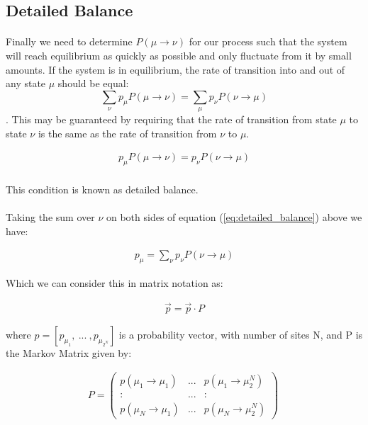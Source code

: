 \documentclass[12pt] {report} %
\begin{document}
			\subsection{Detailed Balance}	\label{sec:detailed_balance}
			
			\paragraph{}
				Finally we need to determine $P{(\mu \rightarrow \nu)}$ for our process such that the system will reach equilibrium as quickly as possible and only fluctuate from it by small amounts. If the system is in equilibrium, the rate of transition into and out of any state $\mu$ should be equal: $$\sum_{\nu}p_\mu P(\mu \rightarrow \nu) = \sum_{\mu}p_\nu P(\nu \rightarrow \mu)$$. This may be guaranteed by requiring that the rate of transition from state $\mu$ to state $\nu$ is the same as the rate of transition from $\nu$ to $\mu$.
				
			\begin{align}
				p_\mu P(\mu \rightarrow \nu) = p_\nu P(\nu \rightarrow \mu)	\label{eq:detailed_balance}
			\end{align}
			
			\paragraph{}
				This condition is known as detailed balance.
				
			\paragraph{}
				Taking the sum over $\nu$ on both sides of equation (\ref{eq:detailed_balance}) above we have:
				
			\begin{align}
				p_\mu = \sum_{\nu} p_\nu P(\nu \rightarrow \mu)
			\end{align}
			
			Which we can consider this in matrix notation as:
			
			\begin{align}
				\vec{p} =  \vec{p} \cdot P \label{eq:matrix_detailed_balance}
			\end{align}
			
			where  $p = \left[ p_{\mu_{1}}, \:...\:, p_{\mu_{2^N}} \right]$ is a probability vector, with number of sites N, and P is the Markov Matrix given by:
			
			\begin{align}
				P =  \left( \begin{array}{ccc}	\label{markov_matrix}
				p(\mu_1 \rightarrow \mu_1) & ... & p(\mu_1 \rightarrow \mu_2^N) \\
				: & ... & : \\
				p(\mu_N \rightarrow \mu_1) & ... & p(\mu_N \rightarrow \mu_2^N) \end{array} \right)\
			\end{align}
			
\end{document}
